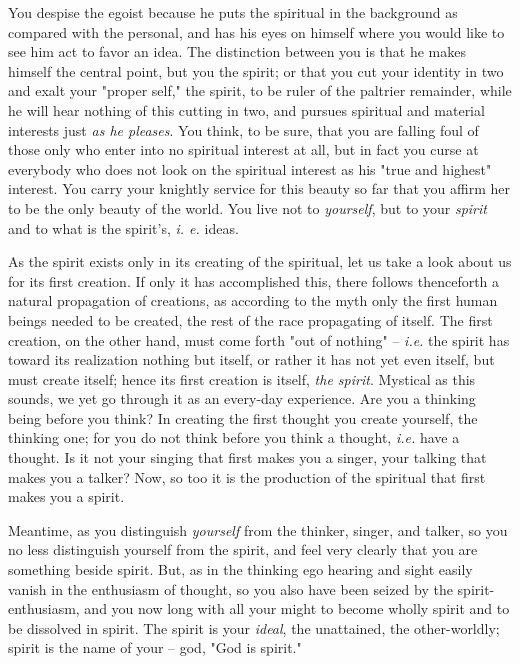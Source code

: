 \documentclass[a4paper]{book}
\begin{document}
You despise the egoist because he puts the spiritual in the background as 
compared with the personal, and has his eyes on himself where you would like 
to see him act to favor an idea. The distinction between you is that he makes 
himself the central point, but you the spirit; or that you cut your identity 
in two and exalt your "{}proper self,"{} the spirit, to be ruler of the 
paltrier remainder, while he will hear nothing of this cutting in two, and 
pursues spiritual and material interests just \textit{as he pleases}. You 
think, to be sure, that you are falling foul of those only who enter into no 
spiritual interest at all, but in fact you curse at everybody who does not 
look on the spiritual interest as his "{}true and highest"{} interest. You 
carry your knightly service for this beauty so far that you affirm her to be 
the only beauty of the world. You live not to \textit{yourself}, but to your 
\textit{spirit} and to what is the spirit's, \textit{i. e.} ideas.

As the spirit exists only in its creating of the spiritual, let us take a look 
about us for its first creation. If only it has accomplished this, there 
follows thenceforth a natural propagation of creations, as according to the 
myth only the first human beings needed to be created, the rest of the race 
propagating of itself. The first creation, on the other hand, must come forth 
"{}out of nothing"{} -- \textit{i.e.} the spirit has toward its realization 
nothing but itself, or rather it has not yet even itself, but must create 
itself; hence its first creation is itself, \textit{the spirit}. Mystical as 
this sounds, we yet go through it as an every-day experience. Are you a 
thinking being before you think? In creating the first thought you create 
yourself, the thinking one; for you do not think before you think a thought, 
\textit{i.e.} have a thought. Is it not your singing that first makes you a 
singer, your talking that makes you a talker? Now, so too it is the production 
of the spiritual that first makes you a spirit.

Meantime, as you distinguish \textit{yourself} from the thinker, singer, and 
talker, so you no less distinguish yourself from the spirit, and feel very 
clearly that you are something beside spirit. But, as in the thinking ego 
hearing and sight easily vanish in the enthusiasm of thought, so you also have 
been seized by the spirit-enthusiasm, and you now long with all your might to 
become wholly spirit and to be dissolved in spirit. The spirit is your 
\textit{ideal}, the unattained, the other-worldly; spirit is the name of your 
-- god, "{}God is spirit."{}
\end{document}
